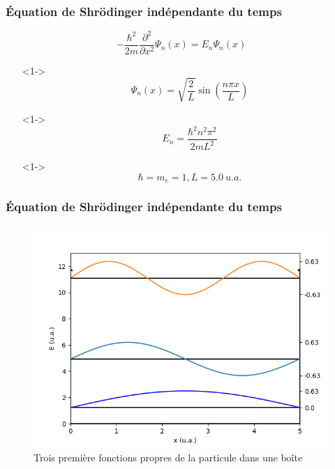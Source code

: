 \documentclass[aspectratio=169]{beamer}
\begin{document}
\begin{frame}
\frametitle{Équation de Shrödinger indépendante du temps}


\begin{equation}\tag{4}
-\frac{\hbar^2}{2m}\frac{\partial^2}{\partial x^2}\Psi_n(x)=E_n\Psi_n(x)
\end{equation} 

\begin{itemize}
\item[]<1-> \begin{equation}\tag{5}
\Psi_n(x)=\sqrt{\frac{2}{L}}\sin(\frac{n\pi x}{L})
\end{equation}  

\item[]<1-> \begin{equation}\tag{8}
E_n=\frac{\hbar^2n^2\pi^2}{2mL^2} 
\end{equation} 
\item[]<1-> \begin{equation}\tag{9}
\hbar=m_e=1 , L=5.0\ u.a. 
\end{equation} 

\end{itemize}

\end{frame}


\begin{frame}
\frametitle{Équation de Shrödinger indépendante du temps}
\begin{figure}[h]
\includegraphics[scale=0.5]{fct_propre}
\caption{Trois première fonctions propres de la particule dans une boîte}
\end{figure}
\end{frame}
\end{document}
